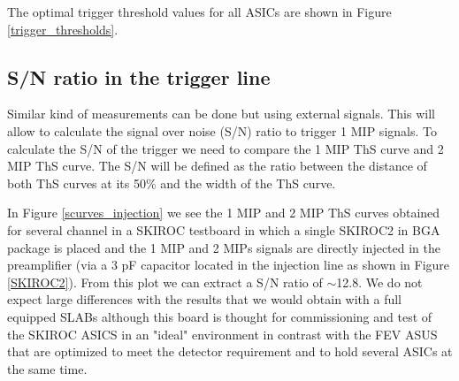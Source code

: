 \documentclass[a4paper,11pt]{article}
\begin{document}
The optimal trigger threshold values for all ASICs are shown in Figure \ref{trigger_thresholds}.


\subsection{S/N ratio in the trigger line}
\label{sec:comm_trigger_sn}

Similar kind of measurements can be done but using external signals. 
This will allow to calculate the signal over noise (S/N) ratio to trigger 1 MIP signals.
To calculate the S/N of the trigger we need to compare the 1 MIP ThS curve and 2 MIP ThS curve. The S/N 
will be defined as the ratio between the distance of both ThS curves at its 50\% and the width of the 
ThS curve.

In Figure \ref{scurves_injection} we see the 1 MIP and 2 MIP ThS curves obtained for several channel
in a SKIROC testboard in which a single SKIROC2 in BGA package is placed and the 1 MIP and 2 MIPs 
 signals are directly injected in the preamplifier 
(via a 3 pF capacitor located in the injection line as shown in Figure \ref{SKIROC2}). 
From this plot we can extract a S/N ratio of $\sim$12.8. 
We do not expect large differences with the results that we would obtain with 
a full equipped SLABs 
although this board is thought for commissioning and test of the SKIROC ASICS in an
"ideal" environment in contrast with the FEV
ASUS that are optimized to meet the detector requirement and to hold several ASICs at the same time.
\end{document}
